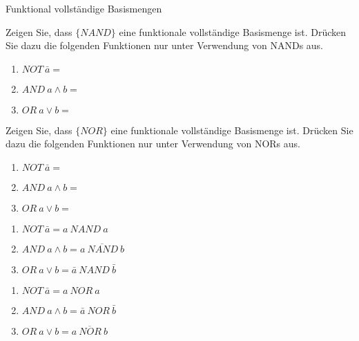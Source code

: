 \documentclass{exercisesheet}
\begin{document}
\begin{exercise}{Funktional vollständige Basismengen}
  \item Zeigen Sie, dass $\{NAND\}$ eine funktionale vollständige Basismenge ist. Drücken Sie dazu die folgenden Funktionen nur unter Verwendung von NANDs aus.
  \begin{enumerate}
    \item $NOT\ \bar{a} = $
    \item $AND\ a \land b = $
    \item $OR\ a \lor b = $
  \end{enumerate}
  \item Zeigen Sie, dass $\{NOR\}$ eine funktionale vollständige Basismenge ist. Drücken Sie dazu die folgenden Funktionen nur unter Verwendung von NORs aus.
  \begin{enumerate}
    \item $NOT\ \bar{a} = $
    \item $AND\ a \land b = $
    \item $OR\ a \lor b = $
  \end{enumerate}
\end{exercise}

\begin{solution}
  \item
  \begin{enumerate}
    \item $NOT\ \bar{a} = a\ NAND\ a$
    \item $AND\ a \land b = \overline{a\ NAND\ b}$
    \item $OR\ a \lor b = \bar{a}\ NAND\ \bar{b}$
  \end{enumerate}
  \item
  \begin{enumerate}
    \item $NOT\ \bar{a} = a\ NOR\ a$
    \item $AND\ a \land b = \bar{a}\ NOR\ \bar{b}$
    \item $OR\ a \lor b = \overline{a\ NOR\ b}$
  \end{enumerate}
\end{solution}
\end{document}
